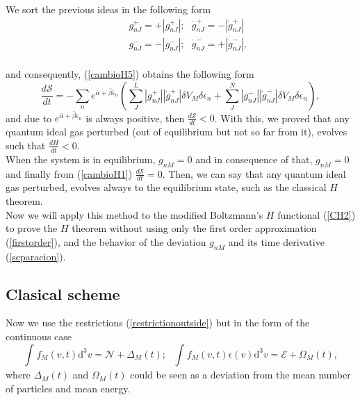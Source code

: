 \documentclass{article}
\newcommand{\de}{\delta}
\newcommand{\Ss}{\mathcal{S}}
\begin{document}
We sort the previous ideas in the following form
\begin{eqnarray}
   &&g^{+}_{nJ}=+|g^{+}_{nJ}|; \ \ \  \dot{g}^{+}_{nJ}=-|\dot{g}^{+}_{nJ}| \nonumber \\
   &&g^{-}_{nJ}=-|g^{-}_{nJ}|; \ \ \ \dot{g}^{-}_{nJ}=+|\dot{g}^{-}_{nJ}| \label{separacion},
\end{eqnarray}{}
\\
and consequently, (\ref{cambioH5}) obtains the following form
\begin{equation}
    \frac{d\Ss}{dt}=-\sum_n  e^{\bar{\alpha}+\bar{\beta}\epsilon_n}\left(\sum_J ^{L} |g^{+}_{nJ}||\dot{g}^{+}_{nJ}|\de V_M \delta \epsilon_n+\sum^{N}_J  |g^{-}_{nJ}||\dot{g}^{-}_{nJ}| \de V_M \delta \epsilon_n \right), \label{cambioH6}
\end{equation}{}
and due to $e^{\bar{\alpha}+\bar{\beta}\epsilon_n}$ is always positive, then $\frac{d\Ss}{dt}<0$. With this, we proved that any quantum ideal gas perturbed (out of equilibrium but not so far from it), evolves such that $\frac{dH}{dt}<0$.\\
When the system is in equilibrium, $g_{nM}=0$ and in consequence of that, $\dot g_{nM}=0$ and finally from (\ref{cambioH1}) $\frac{d\Ss}{dt}=0$. Then, we can say that any quantum ideal gas perturbed, evolves always to the equilibrium state, such as the classical $H$ theorem. \\
Now we will apply this method to the modified Boltzmann's $H$ functional (\ref{CH2}) to prove the $H$ theorem without using only the first order approximation (\ref{firstorder}), and the behavior of the deviation $g_{nM}$ and its time derivative (\ref{separacion}).



\subsection{Clasical scheme}
Now we use the restrictions (\ref{restrictionoutside}) but in the form of the continuous case
\begin{equation}
    \int_{}^{}f_M(v,t)\mathrm{d}^3v=\mathcal{N}+\Delta_M(t); \ \ \ \int_{}^{}f_M(v,t)\epsilon(v)\mathrm{d}^3v=\mathcal{E}+\Omega_M(t)\label{restriccionescambio},
\end{equation}{}
where $\Delta_M(t)$ and $\Omega_M(t)$ could be seen as a deviation from the mean number of particles and mean energy.
\end{document}
